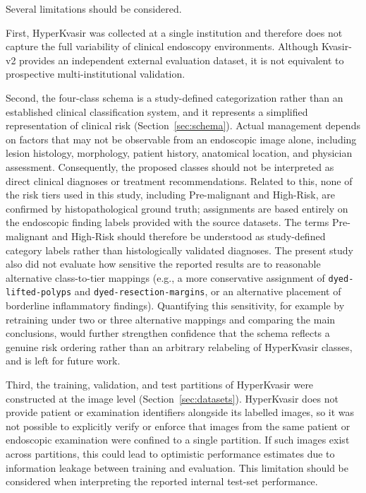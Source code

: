 \documentclass[11pt,a4paper]{article}
\begin{document}
Several limitations should be considered.

First, HyperKvasir was collected at a single institution and therefore does
not capture the full variability of clinical endoscopy environments. Although
Kvasir-v2 provides an independent external evaluation dataset, it is not
equivalent to prospective multi-institutional validation.

Second, the four-class schema is a study-defined categorization rather than
an established clinical classification system, and it represents a
simplified representation of clinical risk (Section~\ref{sec:schema}).
Actual management depends on factors that may not be observable
from an endoscopic image alone, including lesion histology, morphology,
patient history, anatomical location, and physician assessment. Consequently,
the proposed classes should not be interpreted as direct clinical diagnoses
or treatment recommendations. Related to this, none of the risk tiers used in
this study, including Pre-malignant and High-Risk, are confirmed by
histopathological ground truth; assignments are based entirely on the
endoscopic finding labels provided with the source datasets. The terms
Pre-malignant and High-Risk should therefore be understood as
study-defined category labels rather than histologically validated
diagnoses. The present study also did not evaluate how sensitive the
reported results are to reasonable alternative class-to-tier mappings
(e.g., a more conservative assignment of \texttt{dyed-lifted-polyps} and
\texttt{dyed-resection-margins}, or an alternative placement of borderline
inflammatory findings). Quantifying this sensitivity, for example by
retraining under two or three alternative mappings and comparing the main
conclusions, would further strengthen confidence that the schema reflects a
genuine risk ordering rather than an arbitrary relabeling of HyperKvasir
classes, and is left for future work.

Third, the training, validation, and test partitions of HyperKvasir were
constructed at the image level (Section~\ref{sec:datasets}). HyperKvasir
does not provide patient or examination identifiers alongside its labelled
images, so it was not possible to explicitly verify or enforce that images
from the same patient or endoscopic examination were confined to a single
partition. If such images exist across partitions, this could lead to
optimistic performance estimates due to information leakage between
training and evaluation. This limitation should be considered when
interpreting the reported internal test-set performance.
\end{document}
